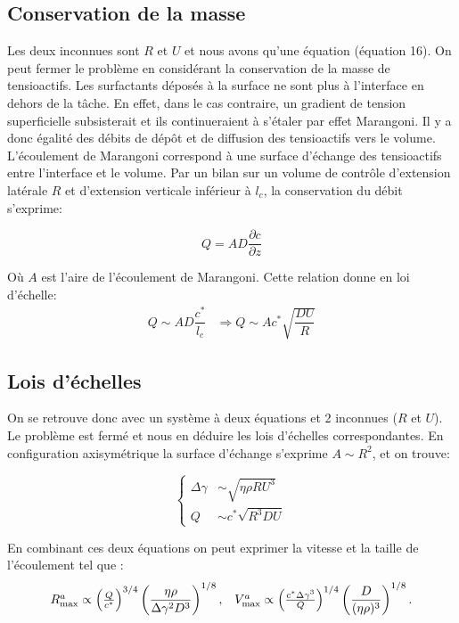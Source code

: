 \documentclass[french, 10pt]{article}
\begin{document}
\subsection{Conservation de la masse}

Les deux inconnues sont $R$ et $U$ et nous avons qu'une équation (équation 16). On peut fermer le problème en considérant la conservation de la masse de tensioactifs. Les surfactants déposés à la surface ne sont plus à l'interface en dehors de la tâche. En effet, dans le cas contraire, un gradient de tension superficielle subsisterait et ils continueraient à s'étaler par effet Marangoni. Il y a donc égalité des débits de dépôt et de diffusion des tensioactifs vers le volume. L'écoulement de Marangoni correspond à une surface d'échange des tensioactifs entre l'interface et le volume. Par un bilan sur un volume de contrôle d'extension latérale $R$ et d'extension verticale inférieur à $l_c$, la conservation du débit s'exprime: 

\[Q=AD\dfrac{\partial c}{\partial z}\]

Où $A$ est l'aire de l'écoulement de Marangoni. Cette relation donne en loi d'échelle: 
\begin{equation}
  \begin{array}{cc}
  Q\sim AD\dfrac{c^*}{l_c} & \Rightarrow Q\sim Ac^*\sqrt{\dfrac{DU}{R}}
  \end{array}
\end{equation}

\subsection{Lois d'échelles} 

On se retrouve donc avec un système à deux équations et 2 inconnues ($R$ et $U$). Le problème est fermé et nous en déduire les lois d'échelles correspondantes. En configuration axisymétrique la surface d'échange s'exprime $A\sim R^2$, et on trouve: 

\begin{equation}
  \left\{\begin{array}{cc}
    \Delta \gamma & \sim \sqrt{\eta\rho R U^3}\\
    Q &\sim c^*\sqrt{R^3DU}
  \end{array}\right.
\end{equation}

En combinant ces deux équations on peut exprimer la vitesse et la taille de l'écoulement tel que : 
\begin{equation}
  \begin{array}{cc}

  R_{\rm max}^{a} \propto \left(\frac{Q}{c^{*}}\right)^{3/4}\left(\dfrac{\eta\rho}{\Delta\gamma^2 D^3}\right)^{1/8}, & V_{\rm max}^{a}\propto\left(\frac{c^{*}\Delta\gamma^3}{Q}\right)^{1/4}\left(\dfrac{D}{(\eta\rho)^3}\right)^{1/8}.\label{eq:rmarangoni}
      
\end{array}
\end{equation}
 
\end{document}
